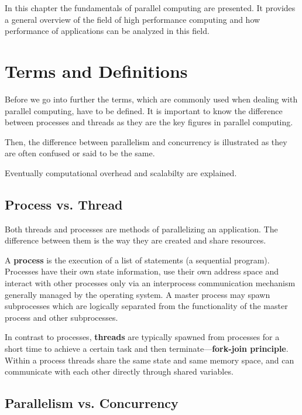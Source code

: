 In this chapter the fundamentals of parallel computing are
presented. It provides a general overview of the field of high
performance computing and how performance of applications can be
analyzed in this field.

\section{Terms and Definitions}
\label{sec:termsdef}


Before we go into further the terms, which are commonly used
when dealing with parallel computing, have to be
defined. It is important to know the difference between processes
and threads as they are the key figures in parallel computing.

Then, the difference between parallelism and concurrency is illustrated
as they are often confused or said to be the same.

Eventually
computational overhead and scalabilty are explained.


\subsection{Process vs. Thread}

Both threads and processes are methods of parallelizing an
application. The difference between them is the way they are
created and share resources.

A \textbf{process} is the execution of a list of statements (a sequential
program). Processes have their own state information, use their own 
address space and interact with other processes only via an
interprocess communication mechanism generally managed by the operating
system. A master process may spawn subprocesses which are logically
separated from the functionality of the master process and other
subprocesses.

In contrast to processes, \textbf{threads} are typically spawned from processes
for a short time to achieve a certain task and then
terminate---\textbf{fork-join principle}. Within a process threads 
share the same state and same memory space, and can communicate with
each other directly through shared variables.

\subsection{Parallelism vs. Concurrency}


